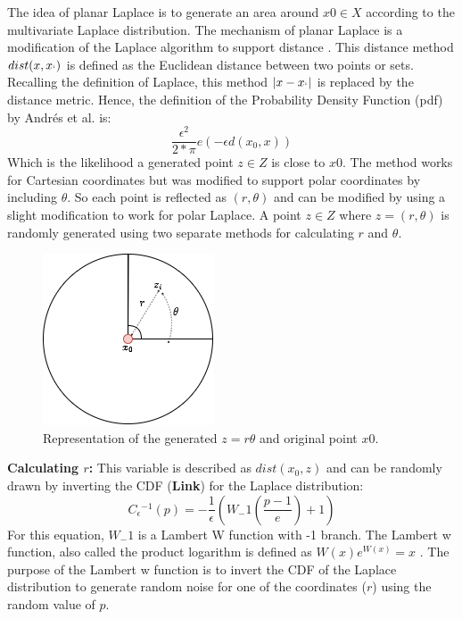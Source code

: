 The idea of planar Laplace is to generate an area around $x0 \in X$ according to the multivariate Laplace distribution.
The mechanism of planar Laplace is a modification of the Laplace algorithm to support distance \citep{DBLP:journals/corr/abs-1212-1984}.
This distance method $dist(x, x_`)$ is defined as the Euclidean distance between two points or sets.
Recalling the definition of Laplace, this method $|x-x_`|$ is replaced by the distance metric.
Hence, the definition of the Probability Density Function (pdf) by Andrés et al. is:
\begin{equation}
  \frac{\epsilon^2}{2*\pi}e(-\epsilon d(x_0, x))
\end{equation}
Which is the likelihood a generated point $z \in Z$ is close to $x0$.
The method works for Cartesian coordinates but was modified to support polar coordinates by including $\theta$.
So each point is reflected as $(r, \theta)$ and can be modified by using a slight modification to work for polar Laplace.
A point $z \in Z$ where $z = (r, \theta)$ is randomly generated using two separate methods for calculating $r$ and $\theta$.
\begin{figure}[h] \label{figure:parea}
  \includegraphics[scale=0.6]{TheorethicalFramework/ND-Laplace/Images/polar-laplace.png}
  \centering
  \caption{Representation of the generated $z = {r \theta}$ and original point $x0$.}
\end{figure}

\textbf{Calculating $r$:}
This variable is described as $dist(x_0, z)$ and can be randomly drawn by inverting the CDF (\textbf{Link}) for the Laplace distribution:
\begin{equation}
  C{_\epsilon}{^{-1}}(p) = - \frac{1}{\epsilon}(W_-1 (\frac{p - 1}{e}) + 1)
\end{equation}
For this equation, $W_-1$ is a Lambert W function with -1 branch.
The Lambert w function, also called the product logarithm is defined as $W(x)e^{W(x)} = x$ \citep{lehtonen_lambert_2016}.
The purpose of the Lambert w function is to invert the CDF of the Laplace distribution to generate random noise for one of the coordinates ($r$) using the random value of $p$.

